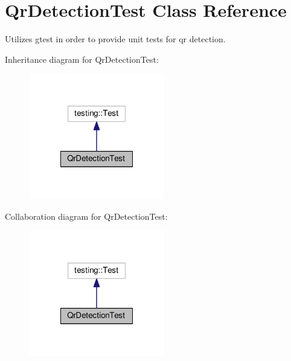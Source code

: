 \hypertarget{classQrDetectionTest}{\section{Qr\-Detection\-Test Class Reference}
\label{classQrDetectionTest}
}


Utilizes gtest in order to provide unit tests for qr detection.  




Inheritance diagram for Qr\-Detection\-Test\-:
\nopagebreak
\begin{figure}[H]
\begin{center}
\leavevmode
\includegraphics[width=168pt]{classQrDetectionTest__inherit__graph}
\end{center}
\end{figure}


Collaboration diagram for Qr\-Detection\-Test\-:
\nopagebreak
\begin{figure}[H]
\begin{center}
\leavevmode
\includegraphics[width=168pt]{classQrDetectionTest__coll__graph}
\end{center}
\end{figure}
